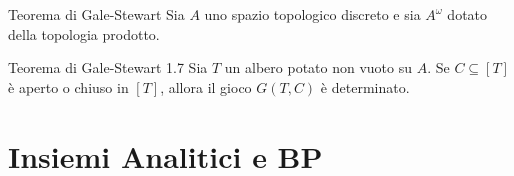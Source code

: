 \documentclass[babel]{beamer}
\renewcommand{\href}[2]{#2}
\begin{document}
\begin{frame}[label={sec:org0524566}]{Teorema di Gale-Stewart}
Sia \(A\) uno \href{../../../../../../../org/roam/20250103145124-topologia.org}{spazio topologico} \href{../../../../../../../org/roam/20250317165247-topologia_discreta.org}{discreto} e sia \(A^{\omega}\) dotato della \href{../../../../../../../org/roam/20250109154723-topologia_prodotto.org}{topologia prodotto}.
\begin{alertblock}{Teorema di Gale-Stewart 1.7}
Sia \(T\) un \href{../../../../../../../org/roam/20250514142154-albero_teoria_descrittiva_degli_insiemi.org}{albero} \href{../../../../../../../org/roam/20250514142208-albero_potato.org}{potato} non vuoto su \(A\). Se \(C \subseteq [T]\) è \href{../../../../../../../org/roam/20250103145124-topologia.org}{aperto} o \href{../../../../../../../org/roam/20250103145124-topologia.org}{chiuso} in \([T]\), allora \href{../../../../../../../org/roam/20250513171520-giochi_di_gale_stewart.org}{il gioco} \(G(T,C)\) è \href{../../../../../../../org/roam/20250513155732-logic_game.org}{determinato}.
\end{alertblock}
\end{frame}
\section{Insiemi Analitici e BP}
\label{sec:org78afcc0}
\end{document}
